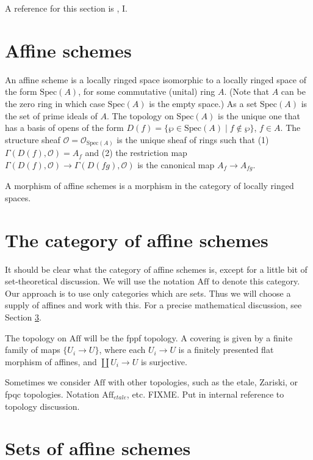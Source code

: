 \medskip\noindent
A reference for this section is \cite{EGA}, I.

\section{Affine schemes}
\label{section-affine-schemes}

\noindent
An affine scheme is a locally ringed space isomorphic to a locally ringed
space of the form $\text{Spec}(A)$, for some commutative (unital) ring $A$.
(Note that $A$ can be the zero ring in which case $\text{Spec}(A)$ is
the empty space.) As a set $\text{Spec}(A)$ is the set of prime ideals of
$A$. The topology on $\text{Spec}(A)$ is the unique one that has a basis
of opens of the form $D(f) = \{ \wp \in\text{Spec}(A) \mid
f \not\in \wp \}$,
$f\in A$. The structure sheaf $\mathcal{O} = 
\mathcal{O}_{\text{Spec}(A)}$ is the unique
sheaf of rings such that (1) $\Gamma(D(f), \mathcal{O}) = A_f$ and
(2) the restriction map $\Gamma(D(f), \mathcal{O}) \to \Gamma(D(fg),
\mathcal{O})$ is the canonical map $A_f \to A_{fg}$.

\medskip\noindent
A morphism of affine schemes is a morphism in the category of locally ringed 
spaces.

\section{The category of affine schemes}
\label{section-category-affine-schemes}

\noindent
It should be clear what the category of affine schemes is, except for a
little bit of set-theoretical discussion. We will use the notation
$\text{Aff}$ to denote this category. Our approach is to use only
categories which are sets. Thus we will choose a supply of affines and
work with this. For a precise mathematical discussion, see
Section \ref{section-sets-of-affines}.

\medskip\noindent
The topology on $\text{Aff}$ will be the fppf topology. A covering is
given by a finite family of maps $\{U_i \to U\}$, where each $U_i \to U$
is a finitely presented flat morphism of affines, and $\coprod U_i \to U$
is surjective. 

\medskip\noindent
Sometimes we consider $\text{Aff}$ with other topologies, such as the
etale, Zariski, or fpqc topologies. Notation $\text{Aff}_{etale}$, etc.
FIXME. Put in internal reference to topology discussion.

\section{Sets of affine schemes}
\label{section-sets-of-affines}

